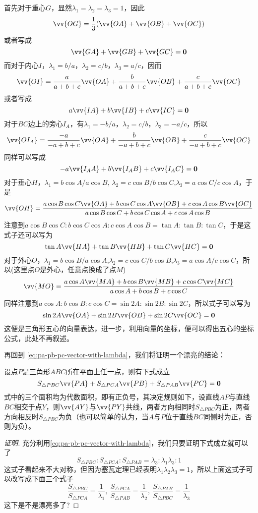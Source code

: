 \begin{example}
 首先对于重心$G$，显然$\lambda_1=\lambda_2=\lambda_3=1$，因此
 \[ \vv{OG} = \frac{1}{3} (\vv{OA} + \vv{OB} + \vv{OC}) \]
 或者写成
 \[ \vv{GA} + \vv{GB} + \vv{GC} = \bm{0} \]
 而对于内心$I$，$\lambda_1 = b/a$，$\lambda_2=c/b$，$\lambda_3=a/c$，因而
 \[ \vv{OI} = \frac{a}{a+b+c} \vv{OA} + \frac{b}{a+b+c} \vv{OB} + \frac{c}{a+b+c} \vv{OC} \]
 或者写成
 \[ a\vv{IA} + b \vv{IB} + c\vv{IC} = \bm{0} \]
 对于$BC$边上的旁心$I_A$，有$\lambda_1=-b/a$，$\lambda_2=c/b$，$\lambda_3=-a/c$，所以
 \[ \vv{OI_A} = \frac{-a}{-a+b+c} \vv{OA} + \frac{b}{-a+b+c} \vv{OB} + \frac{c}{-a+b+c} \vv{OC} \]
 同样可以写成
 \[ -a \vv{I_AA} + b \vv{I_AB} + c\vv{I_AC} = \bm{0} \]
 对于垂心$H$，$\lambda_1=b\cos{A}/a\cos{B}$, $\lambda_2=c\cos{B}/b\cos{C}$,$\lambda_3=a\cos{C}/c\cos{A}$，于是
 \[ \vv{OH} = \frac{a \cos{B}\cos{C} \vv{OA} + b \cos{C}\cos{A} \vv{OB} + c \cos{A}\cos{B} \vv{OC}}{a\cos{B}\cos{C}+b\cos{C}\cos{A}+c\cos{A}\cos{B}} \]
 注意到$a \cos{B}\cos{C} : b \cos{C}\cos{A} : c \cos{A}\cos{B} = \tan{A} : \tan{B} : \tan{C}$，于是这式子还可以写为
 \[ \tan{A} \vv{HA} + \tan{B} \vv{HB} + \tan{C} \vv{HC} = \bm{0} \]
 对于外心$O$，$\lambda_1=b\cos{B}/a\cos{A}$,$\lambda_2=c\cos{C}/b\cos{B}$,$\lambda_3=a\cos{A}/c\cos{C}$，所以(这里点$O$是外心，任意点换成了点$M$)
 \[ \vv{MO} = \frac{a\cos{A}\vv{MA}+b\cos{B}\vv{MB}+c\cos{C}\vv{MC}}{a\cos{A}+b\cos{B}+c\cos{C}} \]
 同样注意到$a\cos{A} : b\cos{B} : c\cos{C} = \sin{2A} : \sin{2B} : \sin{2C}$，所以式子可以写为
 \[ \sin{2A} \vv{OA} + \sin{2B} \vv{OB} + \sin{2C} \vv{OC} = \bm{0} \]
 这便是三角形五心的向量表达，进一步，利用向量的坐标，便可以得出五心的坐标公式，此处不再叙述。

 再回到 \autoref{eq:pa-pb-pc-vector-with-lambda}，我们将证明一个漂亮的结论：
 \begin{theorem}
   \label{theorem:vector-equation-for-point-about-triangle}
   设点$P$是三角形$ABC$所在平面上任一点，则有下式成立
   \begin{equation}
     \label{eq:vector-equation-for-point-about-triangle}
     S_{\triangle PBC}\vv{PA}+S_{\triangle PCA} \vv{PB} + S_{\triangle PAB} \vv{PC}=\bm{0}
   \end{equation}
     式中的三个面积均为代数面积，即有正负号，其决定规则如下，设直线$AP$与直线$BC$相交于点$Y$，则$\vv{AY}$与$\vv{PY}$共线，两者方向相同时$S_{\triangle PBC}$为正，两者方向相反时$S_{\triangle PBC}$为负（也可以简单的认为，当$A$与$P$位于直线$BC$同侧时为正，否则为负）。
 \end{theorem}

 \begin{proof}[证明]
   充分利用\autoref{eq:pa-pb-pc-vector-with-lambda}，我们只要证明下式成立就可以了
   \begin{equation}
     \label{eq:SPBC-SPCA-SPAB-lambda}
    S_{\triangle PBC} : S_{\triangle PCA} : S_{\triangle PAB} = \lambda_3 : \lambda_1\lambda_3 : 1 
   \end{equation}
   这式子看起来不大对称，但因为塞瓦定理已经表明$\lambda_1\lambda_2\lambda_3=1$，所以上面这式子可以改写成下面三个式子
   \[ \frac{S_{\triangle PBC}}{S_{\triangle PCA}} = \frac{1}{\lambda_1}, \  \frac{S_{\triangle PCA}}{S_{\triangle PAB}} = \frac{1}{\lambda_2}, \  \frac{S_{\triangle PAB}}{S_{\triangle PBC}} = \frac{1}{\lambda_3} \]
   这下是不是漂亮多了?


\end{proof}
\end{example}
